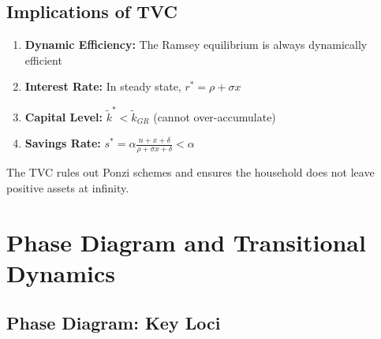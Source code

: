\documentclass[a4paper,11pt]{article}
\newcommand{\ktilde}{\tilde{k}}
\begin{document}
\subsection*{Implications of TVC}

\begin{resultbox}
\begin{enumerate}
    \item \textbf{Dynamic Efficiency:} The Ramsey equilibrium is always dynamically efficient
    \item \textbf{Interest Rate:} In steady state, $r^* = \rho + \sigma x$
    \item \textbf{Capital Level:} $\ktilde^* < \ktilde_{GR}$ (cannot over-accumulate)
    \item \textbf{Savings Rate:} $s^* = \alpha \frac{n+x+\delta}{\rho+\sigma x+\delta} < \alpha$
\end{enumerate}
\end{resultbox}

The TVC rules out Ponzi schemes and ensures the household does not leave positive assets at infinity.

\section{Phase Diagram and Transitional Dynamics}

\subsection*{Phase Diagram: Key Loci}
\end{document}
